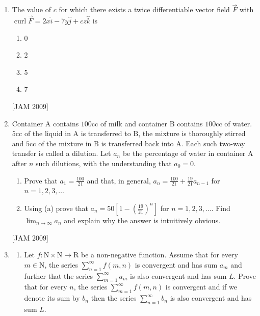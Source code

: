 \begin{enumerate}
\begin{enumerate}
\end{enumerate}
\hfill [JAM 2009]


\item  The value of $c$ for which there exists a twice differentiable vector field $\vec{F}$ with $\operatorname{curl} \vec{F}=2 x \hat{i}-7 y \hat{j}+c z \hat{k}$ is 
\begin{enumerate}
    
\item 0 
\item 2 
\item 5 
\item 7

\end{enumerate}
\hfill [JAM 2009]


\item  Container A contains $100 \mathrm{cc}$ of milk and container B contains $100 \mathrm{cc}$ of water. $5 \mathrm{cc}$ of the liquid in $\mathrm{A}$ is transferred to $\mathrm{B}$, the mixture is thoroughly stirred and $5 \mathrm{cc}$ of the mixture in B is transferred back into A. Each such two-way transfer is called a dilution. Let $a_{n}$ be the percentage of water in container A after $n$ such dilutions, with the understanding that $a_{0}=0$. 
\begin{enumerate}
    \item  Prove that $a_{1}=\frac{100}{21}$ and that, in general, $a_{n}=\frac{100}{21}+\frac{19}{21} a_{n-1}$ for $n=1,2,3, \ldots$ 
\item  Using (a) prove that $a_{n}=50\left[1-\left(\frac{19}{21}\right)^{n}\right]$ for $n=1,2,3, \ldots$. 
Find $\lim _{n \rightarrow \infty} a_{n}$ and explain why the answer is intuitively obvious.
\end{enumerate}
\hfill [JAM 2009]




\item

\begin{enumerate}
    \item  Let $f: \mathrm{N} \times \mathrm{N} \rightarrow \mathrm{R}$ be a non-negative function. Assume that for every $m \in \mathrm{N}$, the series $\sum_{n=1}^{\infty} f(m, n)$ is convergent and has sum $a_{m}$ and further that the series $\sum_{m=1}^{\infty} a_{m}$ is also convergent and has sum $L$. Prove that for every $n$, the series $\sum_{m=1}^{\infty} f(m, n)$ is convergent and if we denote its sum by $b_{n}$ then the series $\sum_{n=1}^{\infty} b_{n}$ is also convergent and has sum $L$.


\end{enumerate}
\end{enumerate}
